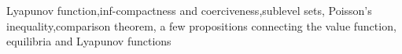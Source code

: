 Lyapunov function,inf-compactness and coerciveness,sublevel sets, Poisson's inequality,comparison theorem, a few propositions connecting the value function, equilibria and Lyapunov functions